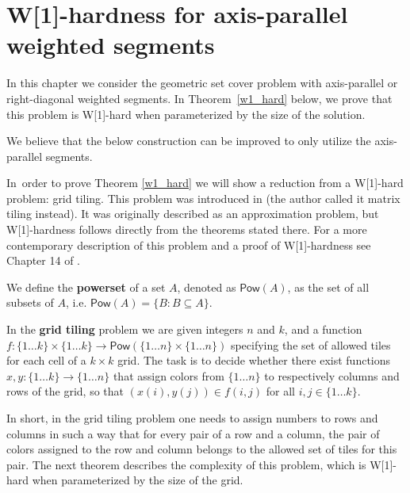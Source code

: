 \chapter{W[1]-hardness for axis-parallel weighted segments}
\label{chapter:w1_hard}

In this chapter we consider the geometric set cover problem with 
axis-parallel or right-diagonal weighted segments.
In Theorem~\ref{w1_hard} below, we prove that this problem is 
W[1]-hard when parameterized by the size of the solution.

We believe that the below construction can be improved to only
utilize the axis-parallel segments.

\wOneHard*

In~order to prove Theorem \ref{w1_hard}
we will show a reduction from a W[1]-hard problem: grid tiling.
This problem was introduced in \cite{marx_grid_tiling}
(the author called it matrix tiling instead).
It was originally described as an approximation problem,
but W[1]-hardness follows directly from the theorems stated there.
For a more contemporary description of this problem
and a proof of W[1]-hardness see Chapter 14 of \cite{platypus_book}.

\newcommand{\pow}{\mathsf{Pow}}

\begin{defi}
We define the \textbf{powerset} of a set $A$, denoted as $\pow(A)$,
as the set of all subsets of $A$, i.e. $\pow(A) = \{B : B \subseteq A\}$.
\end{defi}

\begin{defi}
In the \textbf{grid tiling} problem we are given integers $n$ and $k$,
and a function
$f : \{1 \ldots k\} \times \{1 \ldots k\} \rightarrow \pow(\{1 \ldots n\} \times \{1 \ldots n\})$
specifying the set of allowed tiles for each cell of a $k \times k$ grid.
The task is to decide whether there exist functions
$x,y : \{1 \ldots k\} \rightarrow \{1 \ldots n\}$
that assign colors from $\{1 \ldots n\}$
to respectively columns and rows of the grid,
so that $(x(i), y(j)) \in f(i, j)$ for all $i,j \in \{1 \ldots k\}$.
\end{defi}

In short, in the grid tiling problem one needs to assign numbers
to rows and columns in such a way
that for every pair of a row and a column,
the pair of colors assigned
to the row and column 
belongs to the allowed set of tiles for this pair.
The next theorem describes the complexity of this problem,
which is W[1]-hard when parameterized by the size of the grid.

